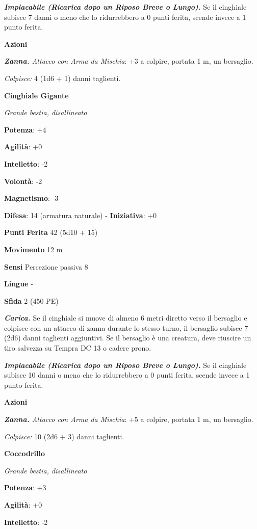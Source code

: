\begin{multicols}{2}
\emph{\textbf{Implacabile (Ricarica dopo un Riposo Breve o Lungo).}} Se
il cinghiale subisce 7 danni o meno che lo ridurrebbero a 0 punti
ferita, scende invece a 1 punto ferita.

\smallskip\textbf{Azioni}

\emph{\textbf{Zanna.} Attacco con Arma da Mischia}: +3 a colpire,
portata 1 m, un bersaglio.

\emph{Colpisce:} 4 (1d6 + 1) danni taglienti.

\textbf{Cinghiale Gigante}

\emph{Grande bestia, disallineato}

\textbf{Potenza}: +4

\textbf{Agilità}: +0

\textbf{Intelletto}: -2

\textbf{Volontà}: -2

\textbf{Magnetismo}: -3

\textbf{Difesa}: 14 (armatura naturale) - \textbf{Iniziativa}: +0

\textbf{Punti Ferita} 42 (5d10 + 15)

\textbf{Movimento} 12 m

\textbf{Sensi} Percezione passiva 8

\textbf{Lingue} -

\textbf{Sfida} 2 (450 PE)\smallskip

\emph{\textbf{Carica.}} Se il cinghiale si muove di almeno 6 metri
diretto verso il bersaglio e colpisce con un attacco di zanna durante lo
stesso turno, il bersaglio subisce 7 (2d6) danni taglienti aggiuntivi.
Se il bersaglio è una creatura, deve riuscire un tiro salvezza su Tempra
DC 13 o cadere prono.

\emph{\textbf{Implacabile (Ricarica dopo un Riposo Breve o Lungo).}} Se
il cinghiale subisce 10 danni o meno che lo ridurrebbero a 0 punti
ferita, scende invece a 1 punto ferita.

\smallskip\textbf{Azioni}

\emph{\textbf{Zanna.} Attacco con Arma da Mischia}: +5 a colpire,
portata 1 m, un bersaglio.

\emph{Colpisce:} 10 (2d6 + 3) danni taglienti.



\textbf{Coccodrillo}

\emph{Grande bestia, disallineato}

\textbf{Potenza}: +3

\textbf{Agilità}: +0

\textbf{Intelletto}: -2


\end{multicols}
